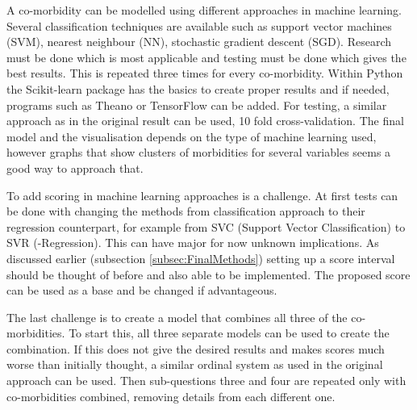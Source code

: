 \documentclass[10pt,a4paper]{article}
\begin{document}
	A co-morbidity can be modelled using different approaches in machine learning. Several classification techniques are available such as support vector machines (SVM), nearest neighbour (NN), stochastic gradient descent (SGD). Research must be done which is most applicable and testing must be done which gives the best results. This is repeated three times for every co-morbidity. Within Python the Scikit-learn package has the basics to create proper results and if needed, programs such as Theano or TensorFlow can be added. For testing, a similar approach as in the original result can be used, 10 fold cross-validation. The final model and the visualisation depends on the type of machine learning used, however graphs that show clusters of morbidities for several variables seems a good way to approach that.
	
	To add scoring in machine learning approaches is a challenge. At first tests can be done with changing the methods from classification approach to their regression counterpart, for example from SVC (Support Vector Classification) to SVR (-Regression). This can have major for now unknown implications. As discussed earlier (subsection \ref{subsec:FinalMethods}) setting up a score interval should be thought of before and also able to be implemented. The proposed score can be used as a base and be changed if advantageous.
	
	The last challenge is to create a model that combines all three of the co-morbidities. To start this, all three separate models can be used to create the combination. If this does not give the desired results and makes scores much worse than initially thought, a similar ordinal system as used in the original approach can be used. Then sub-questions three and four are repeated only with co-morbidities combined, removing details from each different one.
	
	 
	
	
\end{document}
